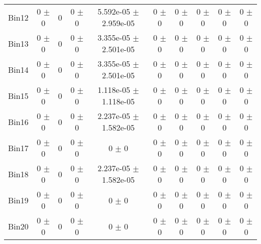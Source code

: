 \begin{tabular}{@{\extracolsep{4pt}}lccccccccc@{}}
     Bin12 & 0 $\pm$ 0 & 0 & 0 $\pm$ 0 & 5.592e-05 $\pm$ 2.959e-05 & 0 $\pm$ 0 & 0 $\pm$ 0 & 0 $\pm$ 0 & 0 $\pm$ 0 & 0 $\pm$ 0 \\ 
     Bin13 & 0 $\pm$ 0 & 0 & 0 $\pm$ 0 & 3.355e-05 $\pm$ 2.501e-05 & 0 $\pm$ 0 & 0 $\pm$ 0 & 0 $\pm$ 0 & 0 $\pm$ 0 & 0 $\pm$ 0 \\ 
     Bin14 & 0 $\pm$ 0 & 0 & 0 $\pm$ 0 & 3.355e-05 $\pm$ 2.501e-05 & 0 $\pm$ 0 & 0 $\pm$ 0 & 0 $\pm$ 0 & 0 $\pm$ 0 & 0 $\pm$ 0 \\ 
     Bin15 & 0 $\pm$ 0 & 0 & 0 $\pm$ 0 & 1.118e-05 $\pm$ 1.118e-05 & 0 $\pm$ 0 & 0 $\pm$ 0 & 0 $\pm$ 0 & 0 $\pm$ 0 & 0 $\pm$ 0 \\ 
     Bin16 & 0 $\pm$ 0 & 0 & 0 $\pm$ 0 & 2.237e-05 $\pm$ 1.582e-05 & 0 $\pm$ 0 & 0 $\pm$ 0 & 0 $\pm$ 0 & 0 $\pm$ 0 & 0 $\pm$ 0 \\ 
     Bin17 & 0 $\pm$ 0 & 0 & 0 $\pm$ 0 & 0 $\pm$ 0 & 0 $\pm$ 0 & 0 $\pm$ 0 & 0 $\pm$ 0 & 0 $\pm$ 0 & 0 $\pm$ 0 \\ 
     Bin18 & 0 $\pm$ 0 & 0 & 0 $\pm$ 0 & 2.237e-05 $\pm$ 1.582e-05 & 0 $\pm$ 0 & 0 $\pm$ 0 & 0 $\pm$ 0 & 0 $\pm$ 0 & 0 $\pm$ 0 \\ 
     Bin19 & 0 $\pm$ 0 & 0 & 0 $\pm$ 0 & 0 $\pm$ 0 & 0 $\pm$ 0 & 0 $\pm$ 0 & 0 $\pm$ 0 & 0 $\pm$ 0 & 0 $\pm$ 0 \\ 
     Bin20 & 0 $\pm$ 0 & 0 & 0 $\pm$ 0 & 0 $\pm$ 0 & 0 $\pm$ 0 & 0 $\pm$ 0 & 0 $\pm$ 0 & 0 $\pm$ 0 & 0 $\pm$ 0 \\ 
\hline\hline
  \end{tabular}
